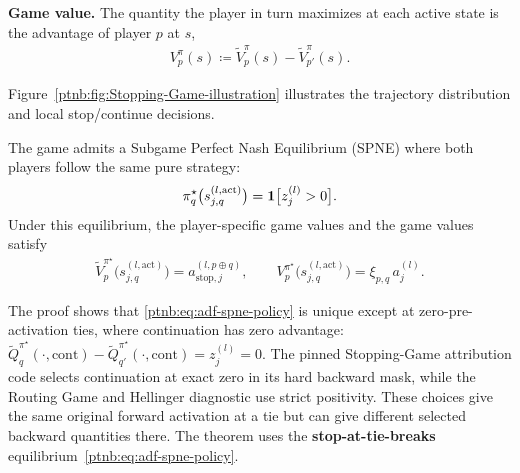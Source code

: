 \begin{definition}
\textbf{Game value.} The quantity the player in turn maximizes at each active state is the
advantage of player $p$ at $s$,
\begin{align}\label{ptnb:eq:adf-advantage}
    V_p^\pi(s) \coloneqq \tilde{V}_p^\pi(s) - \tilde{V}_{p'}^\pi(s).
\end{align}
\end{definition}

Figure~\ref{ptnb:fig:Stopping-Game-illustration} illustrates the trajectory distribution and local stop/continue decisions.

\begin{theoremenv}\label{ptnb:thm:forward-stopping}
The game admits a Subgame Perfect Nash Equilibrium (SPNE) where both players follow the same pure
strategy:
\begin{align} \label{ptnb:eq:adf-spne-policy}
    \pi_q^{\star}\bigl(s_{j,q}^{(l, \mathrm{act})}\bigr) = \mathbf{1}\bigl[z_j^{(l)} > 0\bigr].
\end{align}
Under this equilibrium, the player-specific game values and the game values satisfy
\begin{align}\label{ptnb:eq:adf-spne-values}
    \tilde{V}_p^{\pi^\star}\bigl(s_{j,q}^{(l, \mathrm{act})}\bigr) = a_{\mathrm{stop},j}^{(l, p \oplus
    q)},
    \qquad
    V_p^{\pi^\star}\bigl(s_{j,q}^{(l, \mathrm{act})}\bigr) = \xi_{p,q}\, a_j^{(l)}.
\end{align}\end{theoremenv}

\begin{remark} \label{ptnb:rem:adf-spne-uniqueness}
The proof shows that \eqref{ptnb:eq:adf-spne-policy} is unique except at zero-pre-activation ties,
where continuation has zero advantage: $\tilde Q_q^{\pi^\star}(\cdot,\mathrm{cont})-
\tilde Q_{q'}^{\pi^\star}(\cdot,\mathrm{cont})=z_j^{(l)}=0$. The pinned Stopping-Game attribution code selects continuation at exact zero in its hard backward mask, while the Routing Game and Hellinger diagnostic use strict positivity. These choices give the same original forward activation at a tie but can give different selected backward quantities there. The theorem uses the \textbf{stop-at-tie-breaks} equilibrium~\eqref{ptnb:eq:adf-spne-policy}.
\end{remark}

